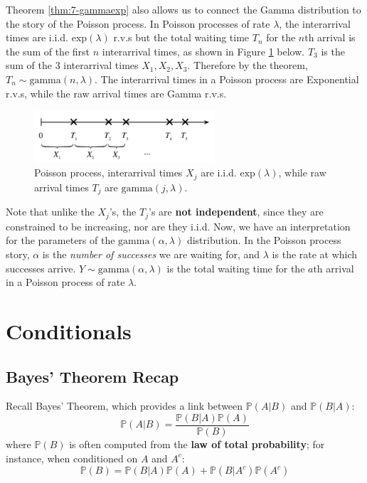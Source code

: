 \documentclass{article}
\begin{document}
\noindent Theorem \ref{thm:7-gammaexp} also allows us to connect the Gamma distribution to the story of the Poisson process. In Poisson processes of rate $\lambda$, the interarrival times are i.i.d. $\text{exp}(\lambda)$ r.v.s but the total waiting time $T_n$ for the $n \text{th}$ arrival is the sum of the first $n$ interarrival times, as shown in Figure \ref{fig:7-poissonprocess} below. $T_3$ is the sum of the 3 interarrival times $X_{1}, X_{2}, X_{3}$. Therefore by the theorem, $T_n \sim \text{gamma}(n, \lambda)$. The interarrival times in a Poisson process are Exponential r.v.s, while the raw arrival times are Gamma r.v.s. 

\begin{figure}[H]
    \centering
    \includegraphics[width=0.6\textwidth]{Images/arrivaltimes.png}
    \caption{Poisson process, interarrival times $X_j$ are i.i.d. $\text{exp}(\lambda)$, while raw arrival times $T_j$ are $\text{gamma}(j, \lambda)$.}
    \label{fig:7-poissonprocess}
\end{figure} 

\noindent Note that unlike the $X_j$'s, the $T_j$'s are \textbf{not independent}, since they are constrained to be increasing, nor are they i.i.d. Now, we have an interpretation for the parameters of the $\text{gamma}(\alpha, \lambda)$ distribution. In the Poisson process story, $\alpha$ is the \textit{number of successes} we are waiting for, and $\lambda$ is the rate at which successes arrive. $Y \sim \text{gamma}(\alpha, \lambda)$ is the total waiting time for the $a \text{th}$ arrival in a Poisson process of rate $\lambda$.

\section{Conditionals}

\subsection{Bayes' Theorem Recap}
\begin{theorem}
    
    Recall Bayes' Theorem, which provides a link between $ \mathbb{P}(A | B)$ and $ \mathbb{P} (B |A )$: \begin{equation}
        \mathbb{P}(A|B) = \frac{ \mathbb{P}(B |A ) \mathbb{P}(A)}{\mathbb{P}(B)} 
    \end{equation} where $ \mathbb{P}(B)$ is often computed from the \textbf{law of total probability}; for instance, when conditioned on $A$ and $A^{c}$: \begin{equation*}
        \mathbb{P}(B) = \mathbb{P} (B | A) \mathbb{P} (A) + \mathbb{P}(B|A^{c}) \mathbb{P} (A^{c})
    \end{equation*}
\end{theorem}
\end{document}
